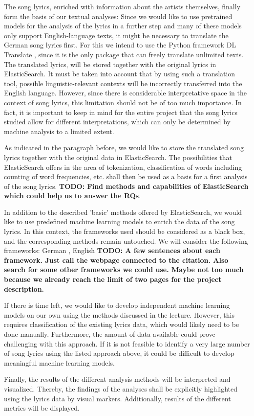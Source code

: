 The song lyrics, enriched with information about the artists themselves, finally form the basis of our textual analyses: Since we would like to use pretrained models for the analysis of the lyrics in a further step and many of these models only support English-language texts, it might be necessary to translate the German song lyrics first. For this we intend to use the Python framework DL Translate \cite{lu_2022}, since it is the only package that can freely translate unlimited texts. The translated lyrics, will be stored together with the original lyrics in ElasticSearch. It must be taken into account that by using such a translation tool, possible linguistic-relevant contexts will be incorrectly transferred into the English language. However, since there is considerable interpretative space in the context of song lyrics, this limitation should not be of too much importance. In fact, it is important to keep in mind for the entire project that the song lyrics studied allow for different interpretations, which can only be determined by machine analysis to a limited extent.

As indicated in the paragraph before, we would like to store the translated song lyrics together with the original data in ElasticSearch. The possibilities that ElasticSearch offers in the area of tokenization, classification of words including counting of word frequencies, etc. shall then be used as a basis for a first analysis of the song lyrics.
\textbf{TODO: Find methods and capabilities of ElasticSearch which could help us to answer the RQs}.

In addition to the described 'basic' methods offered by ElasticSearch, we would like to use predefined machine learning models to enrich the data of the song lyrics. In this context, the frameworks used should be considered as a black box, and the corresponding methods remain untouched. We will consider the following frameworks: German \cite{aluru2020deep,guhr2020training}, English \cite{davidson2017automated,bird2006nltk} \textbf{TODO: A few sentences about each framework. Just call the webpage connected to the citation. Also search for some other frameworks we could use. Maybe not too much because we already reach the limit of two pages for the project description.}

If there is time left, we would like to develop independent machine learning models on our own using the methods discussed in the lecture. However, this requires classification of the existing lyrics data, which would likely need to be done manually. Furthermore, the amount of data available could prove challenging with this approach. If it is not feasible to identify a very large number of song lyrics using the listed approach above, it could be difficult to develop meaningful machine learning models.

Finally, the results of the different analysis methods will be interpreted and visualized. Thereby, the findings of the analyses shall be explicitly highlighted using the lyrics data by visual markers. Additionally, results of the different metrics will be displayed. 







  